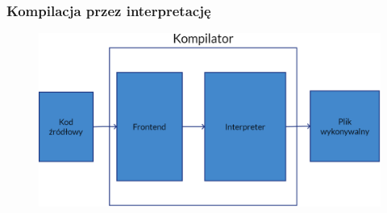 \begin{frame}
	\frametitle{Kompilacja przez interpretację}

	\begin{figure}
		\includegraphics[width=\textwidth]{../assets/compilerouterdiagram.png}
	\end{figure}

\end{frame}
